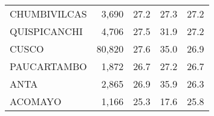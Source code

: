 \begin{tabular}{lrrrr}
	\cellcolor[HTML]{FD6864}CHUMBIVILCAS                                    & 3,690                                                                 & 27.2                                                                             & 27.3                                                                        & 27.2                                                                                \\
	\cellcolor[HTML]{FD6864}QUISPICANCHI                                    & 4,706                                                                 & 27.5                                                                             & 31.9                                                                        & 27.2                                                                                \\
	\cellcolor[HTML]{FD6864}CUSCO                                           & 80,820                                                                & 27.6                                                                             & 35.0                                                                        & 26.9                                                                                \\
	\cellcolor[HTML]{FD6864}PAUCARTAMBO                                     & 1,872                                                                 & 26.7                                                                             & 27.2                                                                        & 26.7                                                                                \\
	\cellcolor[HTML]{FD6864}ANTA                                            & 2,865                                                                 & 26.9                                                                             & 35.9                                                                        & 26.3                                                                                \\
	\cellcolor[HTML]{FD6864}ACOMAYO                                         & 1,166                                                                 & 25.3                                                                             & 17.6                                                                        & 25.8                                                                                \\

\end{tabular}

